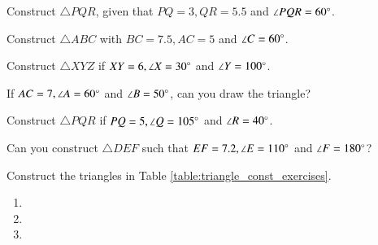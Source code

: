 


\item Construct $\triangle PQR$, given that $PQ = 3, QR = 5.5$ and $\angle PQR = 60 \degree$.
\\
\solution

%
\item Construct $\triangle ABC$  with $BC = 7.5, AC = 5$ and $\angle C = 60\degree$.
\\
\solution

\item Construct $\triangle XYZ$ if $XY = 6, \angle X = 30\degree$ and $\angle Y = 100 \degree$.
\item If $AC = 7, \angle A = 60\degree$ and $\angle B = 50 \degree$, can you draw the triangle?
%
\solution


\item Construct $\triangle PQR$ if $PQ = 5, \angle Q = 105 \degree$ and $\angle R = 40 \degree$.
\item Can you construct $\triangle DEF$ such that $EF = 7.2, \angle E = 110\degree$ and $\angle F = 180\degree$?
\item Construct the  triangles in Table \ref{table:triangle_const_exercises}.
\begin{table}[!ht]
\centering

\caption{}
\label{table:triangle_const_exercises}
\end{table}
\solution
\begin{enumerate}
    \item
    \item 
    \solution
    
    \item 
    \solution
    
        
\end{enumerate}
%

